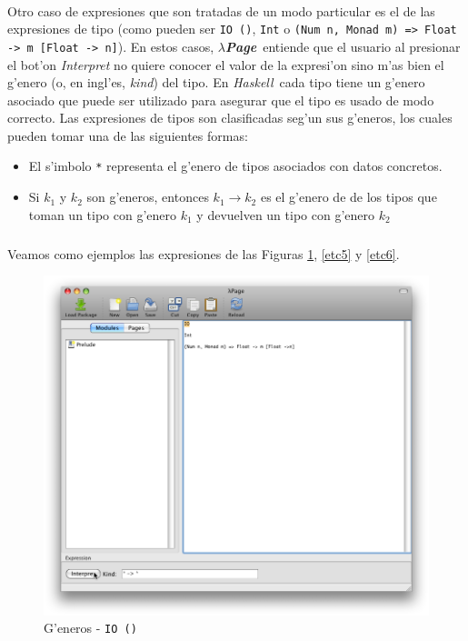 \documentclass[a4paper]{article}
\newcommand{\haskell}{\textsl{Haskell}}
\newcommand{\hpage}{\textbf{\textsl{$\lambda$Page}}}
\begin{document}
\paragraph{}Otro caso de expresiones que son tratadas de un modo particular es el de las expresiones de tipo (como pueden ser \texttt{IO ()}, \texttt{Int} o \texttt{(Num n, Monad m) =>\ Float ->\ m [Float ->\ n]}).  En estos casos, \hpage\ entiende que el usuario al presionar el bot'on \textsl{Interpret} no quiere conocer el valor de la expresi'on sino m'as bien el g'enero (o, en ingl'es, \textsl{kind}) del tipo.  En \haskell\ cada tipo tiene un g'enero asociado que puede ser utilizado para asegurar que el tipo es usado de modo correcto.  Las expresiones de tipos son clasificadas seg'un sus g'eneros, los cuales pueden tomar una de las siguientes formas:
\begin{itemize}
	\item El s'imbolo \texttt{*} representa el g'enero de tipos asociados con datos concretos.
	\item Si $k_{1}$ y $k_{2}$ son g'eneros, entonces $k_{1} \rightarrow k_{2}$ es el g'enero de de los tipos que toman un tipo con g'enero $k_{1}$ y devuelven un tipo con g'enero $k_{2}$
\end{itemize}
\subparagraph{}Veamos como ejemplos las expresiones de las Figuras \ref{etc4}, \ref{etc5} y \ref{etc6}.
\begin{figure}[hp]
	\begin{center}
        	\includegraphics[width=.75\textwidth]{pictures/kind01}
		\caption{G'eneros - \texttt{IO ()}}
		\label{etc4}
	\end{center}
\end{figure}
\end{document}
